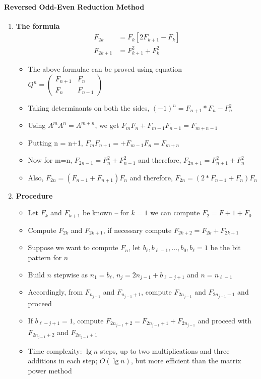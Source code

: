 \documentclass[a4paper,12pt]{article}
\begin{document}
\paragraph{Reversed Odd-Even Reduction Method}
\begin{enumerate}

\item\textbf{The formula}
\[\begin{array}{ll}
          F_{2k} &= F_k \left[ 2F_{k+1} - F_k \right] \\
          F_{2k+1} &= F_{k+1}^2 + F_k^2
      \end{array}\]
\begin{itemize}
\item The above formulae can be proved using equation\\
      $Q^n= \left(\begin{array}{ll}F_{n+1}&F_n\\F_n&F_{n-1}\end{array}\right)$
\item Taking determinants on both the sides, $(-1)^n = F_{n+1}*F_n -        F_n^2$  
\item Using $A^mA^n = A^{m+n}$, we get $F_mF_n + F_{m-1}F_{n-1} =          F_{m+n-1}$
\item Putting n = n+1, $F_mF_{n+1} = + F_{m-1}F_{n} = F_{m+n}$
\item Now for m=n, $F_{2n-1} = F^2_{n} + F^2_{n-1}$ and therefore, $F_{2n+1} = F^2_{n+1} + F^2_{n}$ 
\item Also, $F_{2n} = (F_{n-1} + F_{n+1})F_n$ and therefore, $F_{2n} = (2*F_{n-1} + F_{n})F_n$

\end{itemize}

\item\textbf{Procedure}
\begin{itemize}
\item Let $F_k$ and $F_{k+1}$ be known
      -- for $k=1$ we can compute $F_2=F+1+F_0$
\item Compute $F_{2k}$ and $F_{2k+1}$,
      if necessary compute $F_{2k+2}=F_{2k}+F_{2k+1}$
\item Suppose we want to compute $F_n$,
      let $b_\ell, b_{\ell-1}, \ldots, b_0, b_\ell=1$ be the bit pattern for $n$
\item Build $n$ stepwise as $n_1=b_\ell$,
      $n_j=2n_{j-1}+b_{\ell-j+1}$ and $n=n_{\ell-1}$
\item Accordingly, from $F_{n_{j-1}}$ and $F_{n_{j-1}+1}$, compute
      $F_{2n_{j-1}}$ and $F_{2n_{j-1}+1}$ and proceed
\item If $b_{\ell-j+1}=1$, compute                                         $F_{2n_{j-1}+2}=F_{2n_{j-1}+1}+F_{2n_{j-1}}$
      and proceed with $F_{2n_{j-1}+2}$ and $F_{2n_{j-1}+1}$
\item Time complexity: $\lg n$ steps, up to two multiplications and        three additions in each step; $O(\lg n)$, but more efficient         than the matrix power method
\end{itemize}
\end{enumerate}
\end{document}
